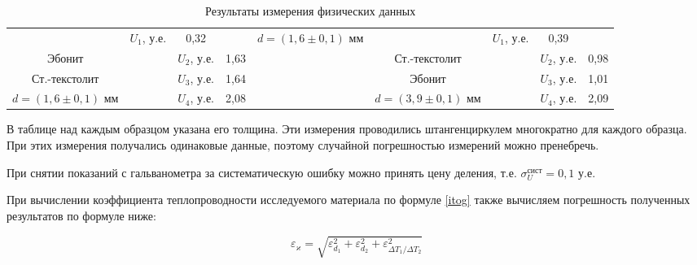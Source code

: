 \documentclass[a4paper,12pt]{article} %
\begin{document}
\begin{table}[H]
\begin{tabular}{ccccccccc}
		\multicolumn{1}{c|}{} &
		\multicolumn{1}{c|}{$U_1$, у.е.} &
		\multicolumn{1}{c|}{0,32} &
		\multicolumn{1}{c|}{} &
		\multicolumn{1}{c|}{$d = (1,6 \pm 0,1)$ мм} &
		\multicolumn{1}{c|}{} &
		\multicolumn{1}{c|}{$U_1$, у.е.} &
		\multicolumn{1}{c|}{0,39} \\ \cline{1-1} \cline{3-4} \cline{6-6} \cline{8-9} 
		\multicolumn{1}{|c|}{Эбонит} &
		\multicolumn{1}{c|}{} &
		\multicolumn{1}{c|}{$U_2$, у.е.} &
		\multicolumn{1}{c|}{1,63} &
		\multicolumn{1}{c|}{} &
		\multicolumn{1}{c|}{Ст.-текстолит} &
		\multicolumn{1}{c|}{} &
		\multicolumn{1}{c|}{$U_2$, у.е.} &
		\multicolumn{1}{c|}{0,98} \\ \cline{1-1} \cline{3-4} \cline{6-6} \cline{8-9} 
		\multicolumn{1}{|c|}{Ст.-текстолит} &
		\multicolumn{1}{c|}{} &
		\multicolumn{1}{c|}{$U_3$, у.е.} &
		\multicolumn{1}{c|}{1,64} &
		\multicolumn{1}{c|}{} &
		\multicolumn{1}{c|}{Эбонит} &
		\multicolumn{1}{c|}{} &
		\multicolumn{1}{c|}{$U_3$, у.е.} &
		\multicolumn{1}{c|}{1,01} \\ \cline{1-1} \cline{3-4} \cline{6-6} \cline{8-9} 
		\multicolumn{1}{|c|}{$d = (1,6 \pm 0,1)$ мм} &
		\multicolumn{1}{c|}{} &
		\multicolumn{1}{c|}{$U_4$, у.е.} &
		\multicolumn{1}{c|}{2,08} &
		\multicolumn{1}{c|}{} &
		\multicolumn{1}{c|}{$d = (3,9 \pm 0,1)$ мм} &
		\multicolumn{1}{c|}{} &
		\multicolumn{1}{c|}{$U_4$, у.е.} &
		\multicolumn{1}{c|}{2,09} \\ \cline{1-1} \cline{3-4} \cline{6-6} \cline{8-9} 
	\end{tabular}
	\caption{Результаты измерения физических данных}
	\label{tab:measurements}
\end{table}

В таблице над каждым образцом указана его толщина. Эти измерения проводились штангенциркулем многократно для каждого образца. При этих измерения получались одинаковые данные, поэтому случайной погрешностью измерений можно пренебречь.

При снятии показаний с гальванометра за систематическую ошибку можно принять цену деления, т.е. $\sigma_U^\text{сист} = 0,1 $ у.е.

При вычислении коэффициента теплопроводности исследуемого материала по формуле \eqref{itog} также вычисляем погрешность полученных результатов по формуле ниже:

\begin{equation}\label{pogr}
\varepsilon_\varkappa = \sqrt{\varepsilon^2_{d_1} + \varepsilon^2_{d_2} + \varepsilon^2_{\Delta T_1/\Delta T_2}}
\end{equation}
\end{document}
